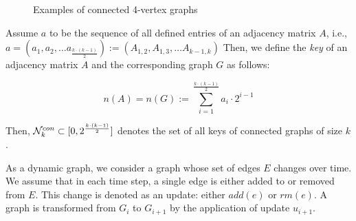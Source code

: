\documentclass{article}
\newcommand{\eqn}[1]{
	\begin{equation*}
		#1
	\end{equation*}
}
\begin{document}
\begin{figure}[!htb]
\centering
\scriptsize
{}
\hfill
{}
\hfill
{}
\caption{Examples of connected 4-vertex graphs}
\end{figure}

Assume $a$ to be the sequence of all defined entries of an adjacency matrix $A$, i.e., $a = (a_1, a_2, \dots a_{\frac{k \cdot (k-1)}{2}}) := (A_{1,2}, A_{1,3}, \dots A_{k-1,k})$
Then, we define the \emph{key} of an adjacency matrix $A$ and the corresponding graph $G$ as follows:

\eqn{n(A) = n(G) := \sum_{i=1}^{\frac{k \cdot (k-1)}{2}} a_i \cdot 2^{i-1}}

Then, ${\cal N}_k^{con} \subset [0,2^{\frac{k \cdot (k-1)}{2}}]$ denotes the set of all keys of connected graphs of size $k$.


As a dynamic graph, we consider a graph whose set of edges $E$ changes over time.
We assume that in each time step, a single edge is either added to or removed from $E$.
This change is denoted as an update: either $add(e)$ or $rm(e)$.
A graph is transformed from $G_i$ to $G_{i+1}$ by the application of update $u_{i+1}$.



\end{document}
